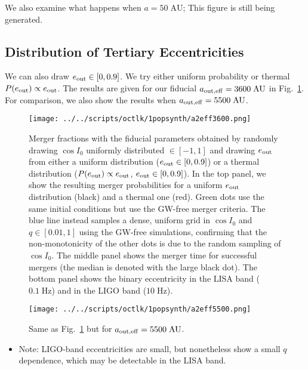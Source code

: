 \documentclass[
        fleqn,
        usenatbib,
    ]{mnras}
\begin{document}
We also examine what happens when $a = 50\;\mathrm{AU}$; \textcolor{Corr}{This
figure is still being generated}.

\subsection{Distribution of Tertiary Eccentricities}

We can also draw $e_{\rm out} \in [0, 0.9]$. We try either uniform probability
or thermal $P(e_{\rm out}) \propto e_{\rm out}$. The results are given for our
fiducial $a_{\rm out, eff} = 3600\;\mathrm{AU}$ in Fig.~\ref{fig:popsynth}. For
comparison, we also show the results when $a_{\rm out, eff} =
5500\;\mathrm{AU}$.
\begin{figure}
    \centering
    \texttt{[image: ../../scripts/octlk/1popsynth/a2eff3600.png]}
    \caption{Merger fractions with the fiducial parameters obtained by randomly
    drawing $\cos I_0$ uniformly distributed $\in [-1, 1]$ and drawing $e_{\rm
    out}$ from either a uniform distribution ($e_{\rm out} \in [0, 0.9]$) or a
    thermal distribution ($P(e_{\rm out}) \propto e_{\rm out}$, $e_{\rm out}
    \in [0, 0.9]$). In the top panel, we show the resulting merger
    probabilities for a uniform $e_{\rm out}$ distribution (black) and a
    thermal one (red). Green dots use the same initial conditions but use the
    GW-free merger criteria. The blue line instead samples a dense, uniform
    grid in $\cos I_0$ and $q \in [0.01, 1]$ using the GW-free simulations,
    confirming that the non-monotonicity of the other dots is due to the random
    sampling of $\cos I_0$. The middle panel shows the merger time for
    successful mergers (the median is denoted with the large black dot). The
    bottom panel shows the binary eccentricity in the LISA band
    ($0.1\;\mathrm{Hz}$) and in the LIGO band ($10 \;\mathrm{Hz}$).
    }\label{fig:popsynth}
\end{figure}
\begin{figure}
    \centering
    \texttt{[image: ../../scripts/octlk/1popsynth/a2eff5500.png]}
    \caption{Same as Fig.~\ref{fig:popsynth} but for $a_{\rm out, eff} =
    5500\;\mathrm{AU}$. }\label{fig:popsynth5500}
\end{figure}

\begin{itemize}
    \item Note: LIGO-band eccentricities are small, but nonetheless show a
        small $q$ dependence, which may be detectable in the LISA band.
\end{itemize}
\end{document}
